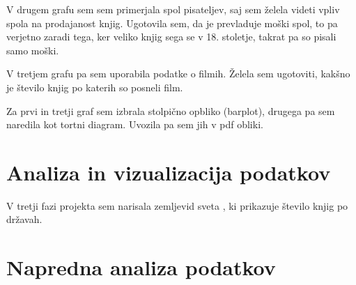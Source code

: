 \documentclass[11pt,a4paper]{article}
\begin{document}
V drugem grafu sem sem primerjala spol pisateljev, saj sem želela videti vpliv spola na prodajanost knjig. Ugotovila sem, da je prevladuje moški spol, to pa verjetno zaradi tega, ker veliko knjig sega se v 18. stoletje, takrat pa so pisali samo moški. 

V tretjem grafu pa sem uporabila podatke o filmih. Želela sem ugotoviti, kakšno je število knjig po katerih so posneli film. 

Za prvi in tretji graf sem izbrala stolpično opbliko (barplot), drugega pa sem naredila kot tortni diagram. Uvozila pa sem jih v pdf obliki. 





\section{Analiza in vizualizacija podatkov}


V tretji fazi projekta sem narisala zemljevid sveta , ki prikazuje število knjig po državah.




\section{Napredna analiza podatkov}
\end{document}
